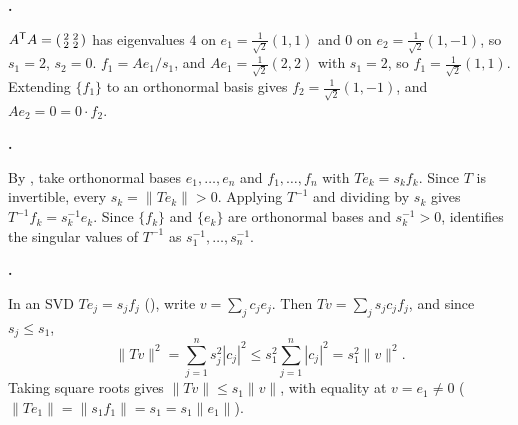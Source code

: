 \documentclass[10pt]{scrartcl}
\begin{document}
\begin{prob}
  \textbf{. }\par
  \begin{steps}
    \ii $A^{\mathsf T}A=\begin{psmallmatrix}2&2\\2&2\end{psmallmatrix}$ has eigenvalues $4$ on $e_1=\frac{1}{\sqrt{2}}(1,1)$ and $0$ on $e_2=\frac{1}{\sqrt{2}}(1,-1)$, so $s_1=2$, $s_2=0$.
    \ii $f_1 = Ae_1/s_1$, and $Ae_1=\frac1{\sqrt2}(2,2)$ with $s_1=2$, so $f_1=\frac{1}{\sqrt{2}}(1,1)$.
    \ii Extending $\{f_1\}$ to an orthonormal basis gives $f_2=\frac{1}{\sqrt{2}}(1,-1)$, and $Ae_2=0=0\cdot f_2$.
  \end{steps}
\end{prob}

\begin{prob}
  \textbf{. }\par
  By , take orthonormal bases $e_1,\dots,e_n$ and $f_1,\dots,f_n$ with $Te_k=s_k f_k$. Since $T$ is invertible, every $s_k=\|Te_k\|>0$. Applying $T^{-1}$ and dividing by $s_k$ gives $T^{-1}f_k = s_k^{-1} e_k$. Since $\{f_k\}$ and $\{e_k\}$ are orthonormal bases and $s_k^{-1}>0$,  identifies the singular values of $T^{-1}$ as $s_1^{-1},\dots,s_n^{-1}$.
\end{prob}

\begin{prob}
  \textbf{. }\par
  In an SVD $Te_j=s_jf_j$ (), write $v=\sum_j c_j e_j$. Then $Tv=\sum_j s_j c_j f_j$, and since $s_j\le s_1$,
  \[
    \|Tv\|^2 = \sum_{j=1}^n s_j^2 |c_j|^2 \le s_1^2 \sum_{j=1}^n |c_j|^2 = s_1^2 \|v\|^2.
  \]
  Taking square roots gives $\|Tv\|\le s_1\|v\|$, with equality at $v=e_1\neq0$ ($\|Te_1\|=\|s_1f_1\|=s_1=s_1\|e_1\|$).
\end{prob}
\end{document}
